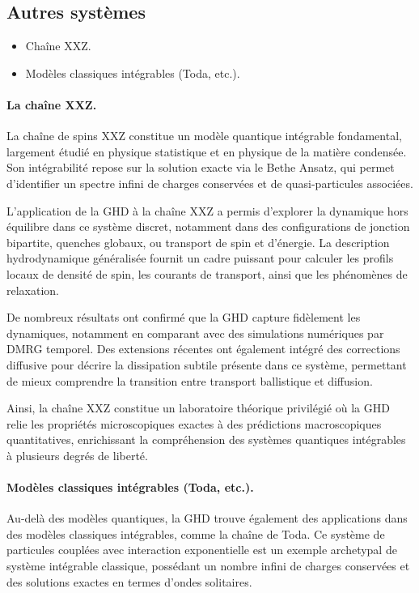 \subsection{Autres systèmes}
{\color{blue}
\begin{itemize}
    \item Chaîne XXZ.
    \item Modèles classiques intégrables (Toda, etc.).
\end{itemize}
}


\paragraph{La chaîne XXZ.}
La chaîne de spins XXZ constitue un modèle quantique intégrable fondamental, largement étudié en physique statistique et en physique de la matière condensée. Son intégrabilité repose sur la solution exacte via le Bethe Ansatz, qui permet d’identifier un spectre infini de charges conservées et de quasi-particules associées.

L’application de la GHD à la chaîne XXZ a permis d’explorer la dynamique hors équilibre dans ce système discret, notamment dans des configurations de jonction bipartite, quenches globaux, ou transport de spin et d’énergie. La description hydrodynamique généralisée fournit un cadre puissant pour calculer les profils locaux de densité de spin, les courants de transport, ainsi que les phénomènes de relaxation.

De nombreux résultats ont confirmé que la GHD capture fidèlement les dynamiques, notamment en comparant avec des simulations numériques par DMRG temporel. Des extensions récentes ont également intégré des corrections diffusive pour décrire la dissipation subtile présente dans ce système, permettant de mieux comprendre la transition entre transport ballistique et diffusion.

Ainsi, la chaîne XXZ constitue un laboratoire théorique privilégié où la GHD relie les propriétés microscopiques exactes à des prédictions macroscopiques quantitatives, enrichissant la compréhension des systèmes quantiques intégrables à plusieurs degrés de liberté.

\paragraph{Modèles classiques intégrables (Toda, etc.).}
Au-delà des modèles quantiques, la GHD trouve également des applications dans des modèles classiques intégrables, comme la chaîne de Toda. Ce système de particules couplées avec interaction exponentielle est un exemple archetypal de système intégrable classique, possédant un nombre infini de charges conservées et des solutions exactes en termes d’ondes solitaires.

